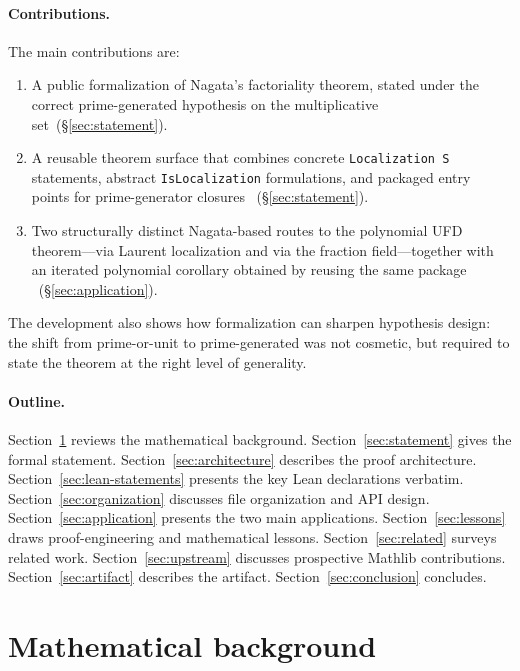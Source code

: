 \documentclass[11pt]{article}
\theoremstyle{plain}
\theoremstyle{definition}
\theoremstyle{remark}
\newcommand{\li}[1]{\texorpdfstring{\texttt{#1}}{#1}}
\begin{document}
\paragraph{Contributions.}
The main contributions are:
\begin{enumerate}[nosep]
\item A public formalization of Nagata's factoriality theorem, stated under the
  correct prime-generated hypothesis on the multiplicative
  set~(\S\ref{sec:statement}).
\item A reusable theorem surface that combines concrete
  \li{Localization\,S} statements, abstract \li{IsLocalization} formulations,
  and packaged entry points for prime-generator closures
  ~(\S\ref{sec:statement}).
\item Two structurally distinct Nagata-based routes to the polynomial UFD
  theorem---via Laurent localization and via the fraction field---together with
  an iterated polynomial corollary obtained by reusing the same package
  ~(\S\ref{sec:application}).
\end{enumerate}
The development also shows how formalization can sharpen hypothesis design: the
shift from prime-or-unit to prime-generated was not cosmetic, but required to
state the theorem at the right level of generality.

\paragraph{Outline.}
Section~\ref{sec:background} reviews the mathematical background.
Section~\ref{sec:statement} gives the formal statement.
Section~\ref{sec:architecture} describes the proof architecture.
Section~\ref{sec:lean-statements} presents the key Lean declarations verbatim.
Section~\ref{sec:organization} discusses file organization and API design.
Section~\ref{sec:application} presents the two main applications.
Section~\ref{sec:lessons} draws proof-engineering and mathematical lessons.
Section~\ref{sec:related} surveys related work.
Section~\ref{sec:upstream} discusses prospective Mathlib contributions.
Section~\ref{sec:artifact} describes the artifact.
Section~\ref{sec:conclusion} concludes.


\section{Mathematical background}\label{sec:background}
\end{document}
